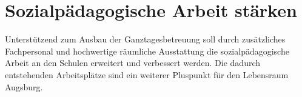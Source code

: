   \section{Sozialpädagogische Arbeit stärken}
  
  Unterstützend zum Ausbau der Ganztagesbetreuung soll durch zusätzliches 
  Fachpersonal und hochwertige räumliche Ausstattung die sozialpädagogische 
  Arbeit an den Schulen erweitert und verbessert werden. Die dadurch 
  entstehenden Arbeitsplätze sind ein weiterer Pluspunkt für den Lebensraum 
  Augsburg.